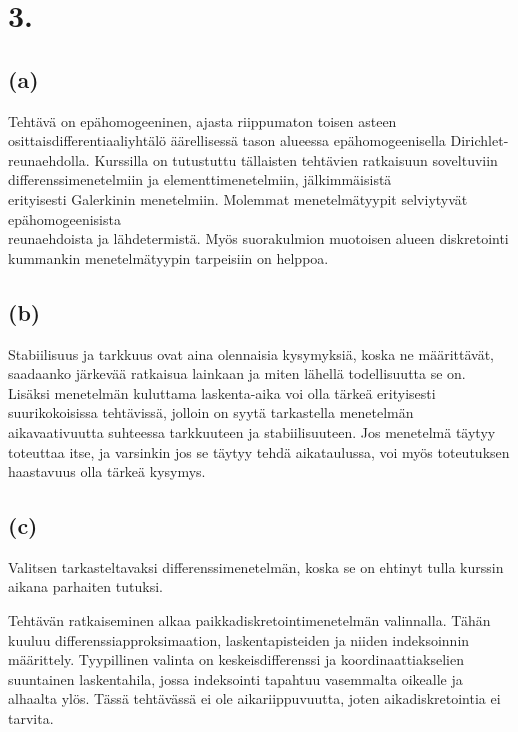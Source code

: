 \documentclass{article}
\begin{document}
\newpage
\section*{3.}

\subsection*{(a)}

Tehtävä on epähomogeeninen, ajasta riippumaton toisen asteen
osittaisdifferentiaaliyhtälö äärellisessä tason alueessa epähomogeenisella
Dirichlet-reunaehdolla.  Kurssilla on tutustuttu tällaisten tehtävien
ratkaisuun soveltuviin differenssimenetelmiin ja elementtimenetelmiin,
jälkimmäisistä \\erityisesti Galerkinin menetelmiin. Molemmat menetelmätyypit
selviytyvät epähomogeenisista \\reunaehdoista ja lähdetermistä. Myös suorakulmion
muotoisen alueen diskretointi kummankin menetelmätyypin tarpei\-siin on
helppoa.

\subsection*{(b)}

Stabiilisuus ja tarkkuus ovat aina olennaisia kysymyksiä, koska ne määrittävät,
saadaanko järkevää ratkaisua lainkaan ja miten lähellä todellisuutta se on.
Lisäksi menetelmän kuluttama laskenta-aika voi olla tärkeä erityisesti suurikokoisissa
tehtävissä, jolloin on syytä tarkastella menetelmän aikavaativuutta suhteessa
tarkkuuteen ja stabiilisuuteen. Jos menetelmä täytyy toteuttaa itse, ja varsinkin
jos se täytyy tehdä aikataulussa, voi myös toteutuksen haastavuus olla tärkeä
kysymys.

\subsection*{(c)}

Valitsen tarkasteltavaksi differenssimenetelmän, koska se on ehtinyt tulla
kurssin aikana parhaiten tutuksi.

Tehtävän ratkaiseminen alkaa paikkadiskretointimenetelmän valinnalla.  Tähän
kuuluu differenssiapproksimaation, laskentapisteiden ja niiden indeksoinnin
määrittely. Tyypillinen valinta on keskeisdifferenssi ja koordinaattiakselien
suuntainen laskentahila, jossa indeksointi tapahtuu vasemmalta oikealle ja
alhaalta ylös. Tässä tehtävässä ei ole aikariippuvuutta, joten aikadiskretointia
ei tarvita.
\end{document}
